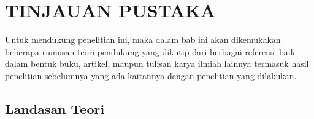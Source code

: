 \fancyhf{} 
\fancyfoot[R]{\thepage}
\chapter{TINJAUAN PUSTAKA}

\par Untuk mendukung penelitian ini, maka dalam bab ini akan dikemukakan beberapa rumusan teori pendukung yang dikutip dari berbagai referensi baik dalam bentuk buku, artikel, maupun tulisan karya ilmiah lainnya termasuk hasil penelitian sebelumnya yang ada kaitannya dengan penelitian yang dilakukan.
\section{Landasan Teori}



